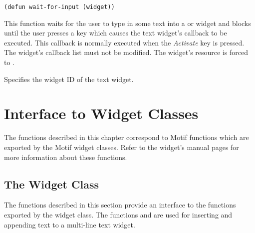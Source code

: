 \begin{lispd}
\syntax\begin{verbatim}
(defun wait-for-input (widget))
\end{verbatim}
\beschr This function waits for the user to type in some text into a
 or  widget and blocks until the user presses a
key which causes the text widget's  callback to be executed. 
This callback is normally executed when the {\it Activate} key is pressed. 
\hinweis The  widget's  callback list must not be 
modified. The widget's  resource is forced to 
.
\parameter
\begin{paramd}
 Specifies the widget ID of the text widget.
\end{paramd}
\end{lispd}

\chapter{Interface to Widget Classes}

The functions described in this chapter correspond to Motif functions which are
exported by the Motif widget classes. Refer to the widget's manual pages for 
more information about these functions.

\section{The  Widget Class}

The functions described in this section provide an interface to the functions
exported by the  widget class. The functions 
and  are used for inserting and appending text to a multi-line
text widget.

